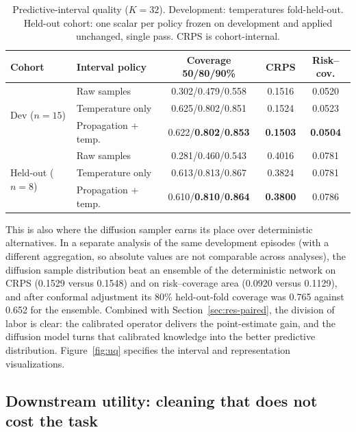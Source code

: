 \begin{table}[t]
\caption{Predictive-interval quality ($K=32$). Development: temperatures fold-held-out. Held-out cohort: one scalar per policy frozen on development and applied unchanged, single pass. CRPS is cohort-internal.}
\label{tab:intervals}
\centering
\small
\begin{tabular}{@{}llccc@{}}
\toprule
Cohort & Interval policy & Coverage 50/80/90\% & CRPS & Risk--cov. \\
\midrule
\multirow{3}{*}{Dev ($n{=}15$)}
 & Raw samples & 0.302/0.479/0.558 & 0.1516 & 0.0520 \\
 & Temperature only & 0.625/0.802/0.851 & 0.1524 & 0.0523 \\
 & Propagation + temp. & 0.622/\textbf{0.802}/\textbf{0.853} & \textbf{0.1503} & \textbf{0.0504} \\
\midrule
\multirow{3}{*}{Held-out ($n{=}8$)}
 & Raw samples & 0.281/0.460/0.543 & 0.4016 & 0.0781 \\
 & Temperature only & 0.613/0.813/0.867 & 0.3824 & 0.0781 \\
 & Propagation + temp. & 0.610/\textbf{0.810}/\textbf{0.864} & \textbf{0.3800} & 0.0786 \\
\bottomrule
\end{tabular}
\end{table}

This is also where the diffusion sampler earns its place over deterministic alternatives. In a separate analysis of the same development episodes (with a different aggregation, so absolute values are not comparable across analyses), the diffusion sample distribution beat an ensemble of the deterministic network on CRPS (0.1529 versus 0.1548) and on risk--coverage area (0.0920 versus 0.1129), and after conformal adjustment its 80\% held-out-fold coverage was 0.765 against 0.652 for the ensemble. Combined with Section~\ref{sec:res-paired}, the division of labor is clear: the calibrated operator delivers the point-estimate gain, and the diffusion model turns that calibrated knowledge into the better predictive distribution. Figure~\ref{fig:uq} specifies the interval and representation visualizations.

\subsection{Downstream utility: cleaning that does not cost the task}
\label{sec:res-downstream}


